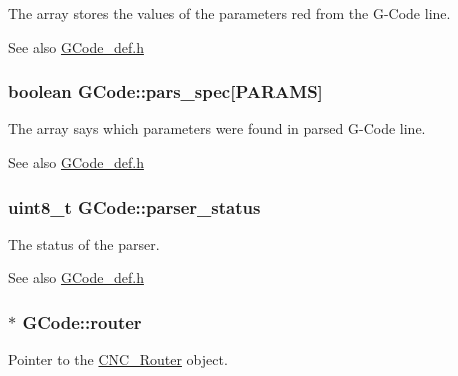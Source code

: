 The array stores the values of the parameters red from the G-\/\+Code line. 

\begin{DoxySeeAlso}{See also}
\hyperlink{_g_code__def_8h}{G\+Code\+\_\+def.\+h} 
\end{DoxySeeAlso}
\hypertarget{class_g_code_a6d11b02685ef1b387a3c9da004547006}{
\subsubsection[{pars\+\_\+spec}]{\setlength{\rightskip}{0pt plus 5cm}boolean G\+Code\+::pars\+\_\+spec\mbox{[}{\bf P\+A\+R\+A\+M\+S}\mbox{]}}}\label{class_g_code_a6d11b02685ef1b387a3c9da004547006}


The array says which parameters were found in parsed G-\/\+Code line. 

\begin{DoxySeeAlso}{See also}
\hyperlink{_g_code__def_8h}{G\+Code\+\_\+def.\+h} 
\end{DoxySeeAlso}
\hypertarget{class_g_code_a56d0e5e56115cd8e7b3f161cc8c0528e}{
\subsubsection[{parser\+\_\+status}]{\setlength{\rightskip}{0pt plus 5cm}uint8\+\_\+t G\+Code\+::parser\+\_\+status}}\label{class_g_code_a56d0e5e56115cd8e7b3f161cc8c0528e}


The status of the parser. 

\begin{DoxySeeAlso}{See also}
\hyperlink{_g_code__def_8h}{G\+Code\+\_\+def.\+h} 
\end{DoxySeeAlso}
\hypertarget{class_g_code_ab060bb5bd169ae7640eb781bef6b78fe}{
\subsubsection[{router}]{$\ast$ G\+Code\+::router}}\label{class_g_code_ab060bb5bd169ae7640eb781bef6b78fe}


Pointer to the \hyperlink{class_c_n_c___router}{C\+N\+C\+\_\+\+Router} object. 

